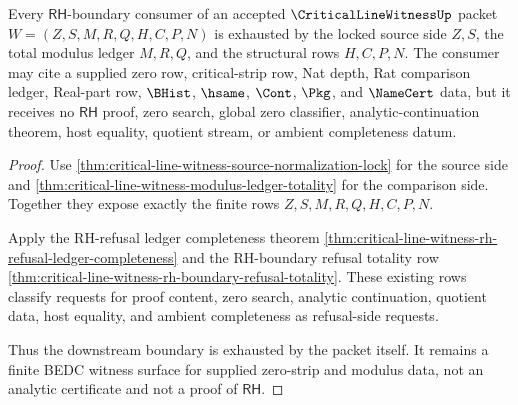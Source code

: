 \begin{theorem}
\label{thm:critical-line-witness-rh-boundary-refusal-exhaustion}
Every $\mathsf{RH}$-boundary consumer of an accepted $\CriticalLineWitnessUp$ packet $W=(Z,S,M,R,Q,H,C,P,N)$ is exhausted by the locked source side $Z,S$, the total modulus ledger $M,R,Q$, and the structural rows $H,C,P,N$. The consumer may cite a supplied zero row, critical-strip row, Nat depth, Rat comparison ledger, Real-part row, $\BHist$, $\hsame$, $\Cont$, $\Pkg$, and $\NameCert$ data, but it receives no $\mathsf{RH}$ proof, zero search, global zero classifier, analytic-continuation theorem, host equality, quotient stream, or ambient completeness datum.
\end{theorem}
\begin{proof}
Use \autoref{thm:critical-line-witness-source-normalization-lock} for the source side and \autoref{thm:critical-line-witness-modulus-ledger-totality} for the comparison side. Together they expose exactly the finite rows $Z,S,M,R,Q,H,C,P,N$.

Apply the RH-refusal ledger completeness theorem \autoref{thm:critical-line-witness-rh-refusal-ledger-completeness} and the RH-boundary refusal totality row \autoref{thm:critical-line-witness-rh-boundary-refusal-totality}. These existing rows classify requests for proof content, zero search, analytic continuation, quotient data, host equality, and ambient completeness as refusal-side requests.

Thus the downstream boundary is exhausted by the packet itself. It remains a finite BEDC witness surface for supplied zero-strip and modulus data, not an analytic certificate and not a proof of $\mathsf{RH}$.
\end{proof}
